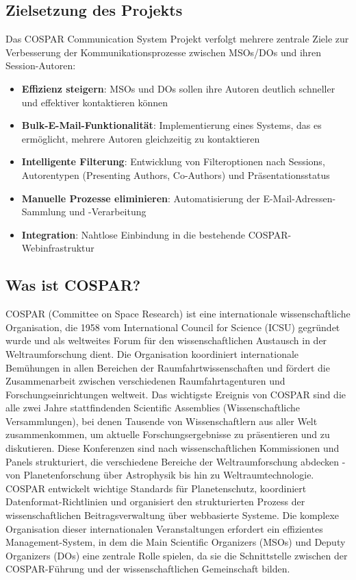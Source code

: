 \documentclass[11pt,a4paper]{article}
\begin{document}
\subsection{Zielsetzung des Projekts}
Das COSPAR Communication System Projekt verfolgt mehrere zentrale Ziele zur Verbesserung der Kommunikationsprozesse zwischen MSOs/DOs und ihren Session-Autoren:

\begin{itemize}
    \item \textbf{Effizienz steigern}: MSOs und DOs sollen ihre Autoren deutlich schneller und effektiver kontaktieren können
    \item \textbf{Bulk-E-Mail-Funktionalität}: Implementierung eines Systems, das es ermöglicht, mehrere Autoren gleichzeitig zu kontaktieren
    \item \textbf{Intelligente Filterung}: Entwicklung von Filteroptionen nach Sessions, Autorentypen (Presenting Authors, Co-Authors) und Präsentationsstatus
    \item \textbf{Manuelle Prozesse eliminieren}: Automatisierung der E-Mail-Adressen-Sammlung und -Verarbeitung
    \item \textbf{Integration}: Nahtlose Einbindung in die bestehende COSPAR-Webinfrastruktur
\end{itemize}

\subsection{Was ist COSPAR?}
COSPAR (Committee on Space Research) ist eine internationale wissenschaftliche Organisation, die 1958 vom International Council for Science (ICSU) gegründet wurde und als weltweites Forum für den wissenschaftlichen Austausch in der Weltraumforschung dient. Die Organisation koordiniert internationale Bemühungen in allen Bereichen der Raumfahrtwissenschaften und fördert die Zusammenarbeit zwischen verschiedenen Raumfahrtagenturen und Forschungseinrichtungen weltweit. Das wichtigste Ereignis von COSPAR sind die alle zwei Jahre stattfindenden Scientific Assemblies (Wissenschaftliche Versammlungen), bei denen Tausende von Wissenschaftlern aus aller Welt zusammenkommen, um aktuelle Forschungsergebnisse zu präsentieren und zu diskutieren. Diese Konferenzen sind nach wissenschaftlichen Kommissionen und Panels strukturiert, die verschiedene Bereiche der Weltraumforschung abdecken - von Planetenforschung über Astrophysik bis hin zu Weltraumtechnologie. COSPAR entwickelt wichtige Standards für Planetenschutz, koordiniert Datenformat-Richtlinien und organisiert den strukturierten Prozess der wissenschaftlichen Beitragsverwaltung über webbasierte Systeme. Die komplexe Organisation dieser internationalen Veranstaltungen erfordert ein effizientes Management-System, in dem die Main Scientific Organizers (MSOs) und Deputy Organizers (DOs) eine zentrale Rolle spielen, da sie die Schnittstelle zwischen der COSPAR-Führung und der wissenschaftlichen Gemeinschaft bilden.
\end{document}
